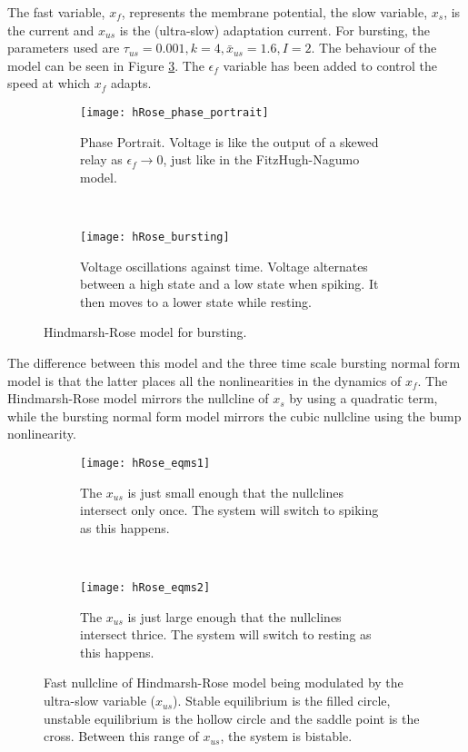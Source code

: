 \documentclass[a4paper, 12pt]{article}
\begin{document}
The fast variable, $x_f$, represents the membrane potential, the slow variable, $x_s$, is the current and $x_{us}$ is the (ultra-slow) adaptation current. For bursting, the parameters used are $\tau_{us} = 0.001, k = 4, \bar{x}_{us} = 1.6, I = 2$. The behaviour of the model can be seen in Figure \ref{fig:hRose_bursting}. The $\epsilon_f$ variable has been added to control the speed at which $x_f$ adapts. 

\begin{figure}[h!]
    \centering
    \begin{subfigure}[t]{0.48\textwidth}
        \texttt{[image: hRose\_phase\_portrait]}
        \caption{Phase Portrait. Voltage is like the output of a skewed relay as $\epsilon_f\rightarrow0$, just like in the FitzHugh-Nagumo model.}
        \label{fig:hRose_phase_portrait}
    \end{subfigure}
    ~ %
    \begin{subfigure}[t]{0.48\textwidth}
        \texttt{[image: hRose\_bursting]}
        \caption{Voltage oscillations against time. Voltage alternates between a high state and a low state when spiking. It then moves to a lower state while resting.}
        \label{fig:hRose_voltage_time}
    \end{subfigure}
\caption{Hindmarsh-Rose model for bursting.}
\label{fig:hRose_bursting}
\end{figure}

The difference between this model and the three time scale bursting normal form model is that the latter places all the nonlinearities in the dynamics of $x_f$. The Hindmarsh-Rose model mirrors the nullcline of $x_s$ by using a quadratic term, while the bursting normal form model mirrors the cubic nullcline using the bump nonlinearity. 

\begin{figure}[t]
    \centering
    \begin{subfigure}[t]{0.48\textwidth}
        \texttt{[image: hRose\_eqms1]}
        \caption{The $x_{us}$ is just small enough that the nullclines intersect only once. The system will switch to spiking as this happens.}
        \label{fig:hRose_eqms1}
    \end{subfigure}
    ~ %
    \begin{subfigure}[t]{0.48\textwidth}
        \texttt{[image: hRose\_eqms2]}
        \caption{The $x_{us}$ is just large enough that the nullclines intersect thrice. The system will switch to resting as this happens.}
        \label{fig:hRose_eqms2}
    \end{subfigure}
\caption{Fast nullcline of Hindmarsh-Rose model being modulated by the ultra-slow variable ($x_{us}$). Stable equilibrium is the filled circle, unstable equilibrium is the hollow circle and the saddle point is the cross. Between this range of $x_{us}$, the system is bistable.}
\label{fig:hRose_changing_eqms}
\end{figure}
\end{document}
